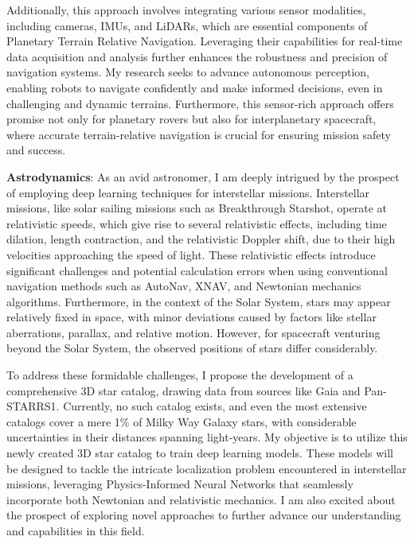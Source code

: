\documentclass[a4,20pt]{article}
\begin{document}
\begin{large}
Additionally, this approach involves integrating various sensor modalities, including cameras, IMUs, and LiDARs, which are essential components of Planetary Terrain Relative Navigation. Leveraging their capabilities for real-time data acquisition and analysis further enhances the robustness and precision of navigation systems. My research seeks to advance autonomous perception, enabling robots to navigate confidently and make informed decisions, even in challenging and dynamic terrains. Furthermore, this sensor-rich approach offers promise not only for planetary rovers but also for interplanetary spacecraft, where accurate terrain-relative navigation is crucial for ensuring mission safety and success.\vspace{-0.25cm}


\textbf{Astrodynamics}: As an avid astronomer, I am deeply intrigued by the prospect of employing deep learning techniques for interstellar missions. Interstellar missions, like solar sailing missions such as Breakthrough Starshot, operate at relativistic speeds, which give rise to several relativistic effects, including time dilation, length contraction, and the relativistic Doppler shift, due to their high velocities approaching the speed of light. These relativistic effects introduce significant challenges and potential calculation errors when using conventional navigation methods such as AutoNav, XNAV, and Newtonian mechanics algorithms. Furthermore, in the context of the Solar System, stars may appear relatively fixed in space, with minor deviations caused by factors like stellar aberrations, parallax, and relative motion. However, for spacecraft venturing beyond the Solar System, the observed positions of stars differ considerably.\vspace{-0.35cm}

To address these formidable challenges, I propose the development of a comprehensive 3D star catalog, drawing data from sources like Gaia and Pan-STARRS1. Currently, no such catalog exists, and even the most extensive catalogs cover a mere 1\% of Milky Way Galaxy stars, with considerable uncertainties in their distances spanning light-years. My objective is to utilize this newly created 3D star catalog to train deep learning models. These models will be designed to tackle the intricate localization problem encountered in interstellar missions, leveraging Physics-Informed Neural Networks that seamlessly incorporate both Newtonian and relativistic mechanics. I am also excited about the prospect of exploring novel approaches to further advance our understanding and capabilities in this field.\vspace{-0.35cm}


\end{large}
\end{document}
